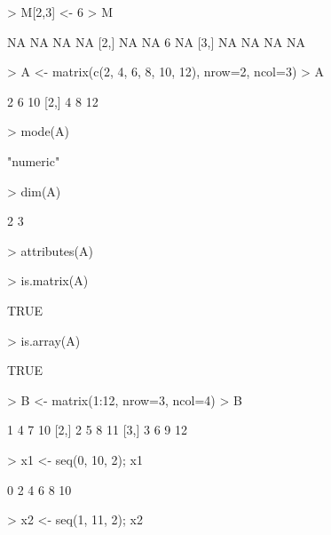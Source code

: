 \documentclass{article}
\begin{document}
\begin{Schunk}
\begin{Sinput}
> M[2,3] <- 6
> M
\end{Sinput}
\begin{Soutput}
     [,1] [,2] [,3] [,4]
[1,]   NA   NA   NA   NA
[2,]   NA   NA    6   NA
[3,]   NA   NA   NA   NA
\end{Soutput}
\begin{Sinput}
> A <- matrix(c(2, 4, 6, 8, 10, 12), nrow=2, ncol=3)
> A
\end{Sinput}
\begin{Soutput}
     [,1] [,2] [,3]
[1,]    2    6   10
[2,]    4    8   12
\end{Soutput}
\begin{Sinput}
> mode(A)
\end{Sinput}
\begin{Soutput}
[1] "numeric"
\end{Soutput}
\begin{Sinput}
> dim(A)
\end{Sinput}
\begin{Soutput}
[1] 2 3
\end{Soutput}
\begin{Sinput}
> attributes(A)
\end{Sinput}
\begin{Sinput}
> is.matrix(A)
\end{Sinput}
\begin{Soutput}
[1] TRUE
\end{Soutput}
\begin{Sinput}
> is.array(A)
\end{Sinput}
\begin{Soutput}
[1] TRUE
\end{Soutput}
\begin{Sinput}
> B <- matrix(1:12, nrow=3, ncol=4)
> B
\end{Sinput}
\begin{Soutput}
     [,1] [,2] [,3] [,4]
[1,]    1    4    7   10
[2,]    2    5    8   11
[3,]    3    6    9   12
\end{Soutput}
\begin{Sinput}
> x1 <- seq(0, 10, 2); x1
\end{Sinput}
\begin{Soutput}
[1]  0  2  4  6  8 10
\end{Soutput}
\begin{Sinput}
> x2 <- seq(1, 11, 2); x2
\end{Sinput}
\begin{Soutput}

\end{Soutput}
\end{Schunk}
\end{document}
